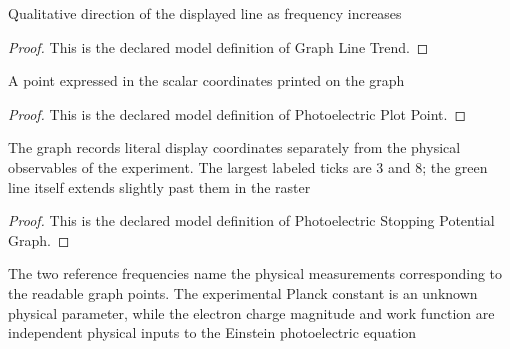 \begin{definition}
  \label{def:physics:phyx-mini-0499:phyxminiproblems-problemphyxmini0499-graphlinetrend}
  Qualitative direction of the displayed line as frequency increases
\end{definition}
\begin{proof}
  This is the declared model definition of Graph Line Trend.
\end{proof}
\begin{definition}
  \label{def:physics:phyx-mini-0499:phyxminiproblems-problemphyxmini0499-photoelectricplotpoint}
  A point expressed in the scalar coordinates printed on the graph
\end{definition}
\begin{proof}
  This is the declared model definition of Photoelectric Plot Point.
\end{proof}
\begin{definition}
  \label{def:physics:phyx-mini-0499:phyxminiproblems-problemphyxmini0499-photoelectricstoppingpotentialgraph}
  The graph records literal display coordinates separately from the physical observables of the experiment. The largest labeled ticks are 3 and 8; the green line itself extends slightly past them in the raster
\end{definition}
\begin{proof}
  This is the declared model definition of Photoelectric Stopping Potential Graph.
\end{proof}
\begin{definition}
  \label{def:physics:phyx-mini-0499:phyxminiproblems-problemphyxmini0499-photoelectricexperiment}
  The two reference frequencies name the physical measurements corresponding to the readable graph points. The experimental Planck constant is an unknown physical parameter, while the electron charge magnitude and work function are independent physical inputs to the Einstein photoelectric equation
\end{definition}
